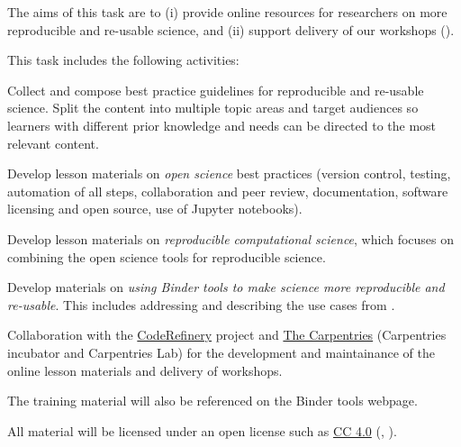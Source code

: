 \begin{task}[
  title=Best practice guidelines for reproducible science,
  id=online-resources,
  lead=UIO,
  PM=13,
  wphases={0-36!0.36},
  partners={SRL,MP,IFR}
]
The aims of this task are to (i) provide online resources for researchers on more reproducible
and re-usable science, and (ii) support delivery of our workshops
().

This task includes the following activities:
  \begin{compactitem}
  \item Collect and compose best practice guidelines for reproducible and
    re-usable science. Split the content into multiple topic areas and target audiences so learners
    with different prior knowledge and needs can be directed to the most relevant content.
  \item Develop lesson materials on \emph{open science} best practices (version
    control, testing, automation of all steps, collaboration and peer review,
    documentation, software licensing and open source, use of Jupyter
    notebooks).
  \item Develop lesson materials on \emph{reproducible computational science},
    which focuses on combining the open science tools for reproducible science.
  \item Develop materials on \emph{using Binder tools to make science more
      reproducible and re-usable}. This includes addressing and describing the
    use cases from .
  \item Collaboration with the \href{https://coderefinery.org}{CodeRefinery}
    project and \href{https://carpentries.org/}{The Carpentries} (Carpentries incubator and Carpentries Lab)
    for the development and maintainance of the online lesson materials and delivery of workshops.
  \item The training material will also be referenced on the Binder tools webpage.
  \end{compactitem}
  All material will be licensed under an open license such as
  \href{https://creativecommons.org/licenses/by/4.0/}{CC 4.0}
  (, ).
\end{task}
